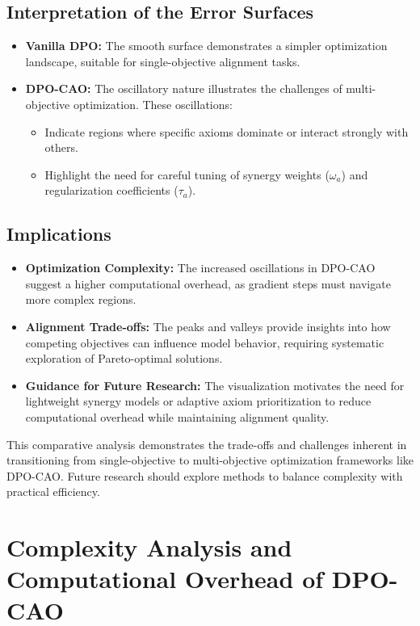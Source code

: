 \subsection{Interpretation of the Error Surfaces}
\begin{itemize}
    \item \textbf{Vanilla DPO:} The smooth surface demonstrates a simpler optimization landscape, suitable for single-objective alignment tasks.
    \item \textbf{DPO-CAO:} The oscillatory nature illustrates the challenges of multi-objective optimization. These oscillations:
    \begin{itemize}
        \item Indicate regions where specific axioms dominate or interact strongly with others.
        \item Highlight the need for careful tuning of synergy weights (\(\omega_a\)) and regularization coefficients (\(\tau_a\)).
    \end{itemize}
\end{itemize}

\subsection{Implications}
\begin{itemize}
    \item \textbf{Optimization Complexity:} The increased oscillations in DPO-CAO suggest a higher computational overhead, as gradient steps must navigate more complex regions.
    \item \textbf{Alignment Trade-offs:} The peaks and valleys provide insights into how competing objectives can influence model behavior, requiring systematic exploration of Pareto-optimal solutions.
    \item \textbf{Guidance for Future Research:} The visualization motivates the need for lightweight synergy models or adaptive axiom prioritization to reduce computational overhead while maintaining alignment quality.
\end{itemize}



This comparative analysis demonstrates the trade-offs and challenges inherent in transitioning from single-objective to multi-objective optimization frameworks like DPO-CAO. Future research should explore methods to balance complexity with practical efficiency.




\section{Complexity Analysis and Computational Overhead of DPO-CAO}
\label{sec:appendix_complexity_analysis}

